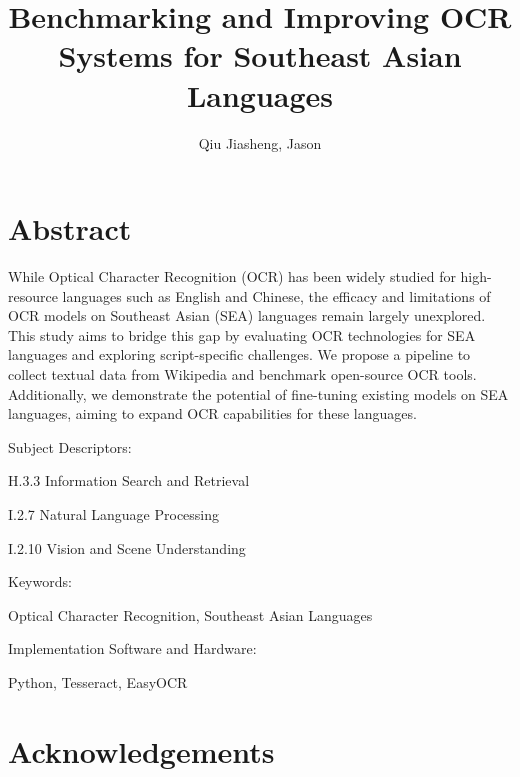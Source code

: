 \documentclass[12pt,oneside]{memoir}
\title{Benchmarking and Improving OCR Systems for Southeast Asian Languages}
\author{Qiu Jiasheng, Jason}
\begin{document}
\frontmatter

\pagestyle{plain}

\makecover

\setcounter{page}{1}

\maketitle
{}

\chapter*{\centering\large Abstract}

While Optical Character Recognition (OCR) has been widely studied for high-resource languages such as English and Chinese, the efficacy and limitations of OCR models on Southeast Asian (SEA) languages remain largely unexplored. This study aims to bridge this gap by evaluating OCR technologies for SEA languages and exploring script-specific challenges. We propose a pipeline to collect textual data from Wikipedia and benchmark open-source OCR tools. Additionally, we demonstrate the potential of fine-tuning existing models on SEA languages, aiming to expand OCR capabilities for these languages.

\vspace{20pt}
Subject Descriptors:

\hspace*{0.3in} H.3.3 Information Search and Retrieval

\hspace*{0.3in} I.2.7 Natural Language Processing

\hspace*{0.3in} I.2.10 Vision and Scene Understanding

Keywords:

\hspace*{0.3in} Optical Character Recognition, Southeast Asian Languages

Implementation Software and Hardware:

\hspace*{0.3in} Python, Tesseract, EasyOCR

\chapter*{\centering\large Acknowledgements}
\end{document}
